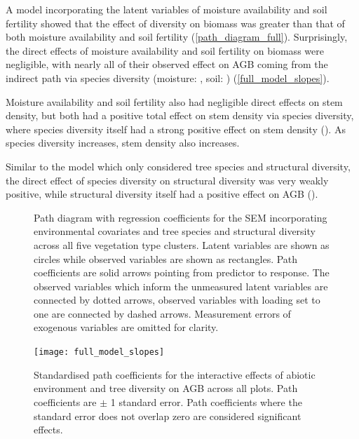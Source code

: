 \documentclass[11pt,a4paper]{article}
\begin{document}
A model incorporating the latent variables of moisture availability and soil fertility showed that the effect of diversity on biomass was greater than that of both moisture availability and soil fertility (\autoref{path_diagram_full}). Surprisingly, the direct effects of moisture availability and soil fertility on biomass were negligible, with nearly all of their observed effect on AGB coming from the indirect path via species diversity (moisture: \rgmbd{}, soil: \rgsbd{}) (\autoref{full_model_slopes}). 

Moisture availability and soil fertility also had negligible direct effects on stem density, but both had a positive total effect on stem density via species diversity, where species diversity itself had a strong positive effect on stem density (\rgid{}). As species diversity increases, stem density also increases. 

Similar to the model which only considered tree species and structural diversity, the direct effect of species diversity on structural diversity was very weakly positive, while structural diversity itself had a positive effect on AGB (\rghb{}). 

\begin{figure}[H]
\centering
	
	\caption{Path diagram with regression coefficients for the SEM incorporating environmental covariates and tree species and structural diversity across all five vegetation type clusters. Latent variables are shown as circles while observed variables are shown as rectangles. Path coefficients are solid arrows pointing from predictor to response. The observed variables which inform the unmeasured latent variables are connected by dotted arrows, observed variables with loading set to one are connected by dashed arrows. Measurement errors of exogenous variables are omitted for clarity.}
	\label{full_mod}
\end{figure}

\begin{figure}[H]
\centering
	\texttt{[image: full\_model\_slopes]}
	\caption{Standardised path coefficients for the interactive effects of abiotic environment and tree diversity on AGB across all plots. Path coefficients are $\pm$ 1 standard error. Path coefficients where the standard error does not overlap zero are considered significant effects.}
	\label{full_model_slopes}
\end{figure}

\end{document}
